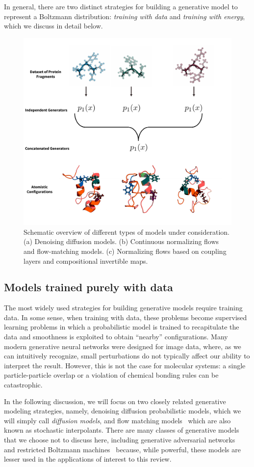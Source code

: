 \documentclass[11pt]{article}
\begin{document}
In general, there are two distinct strategies for building a generative model to represent a Boltzmann distribution: \emph{training with data} and \emph{training with energy}, which we discuss in detail below. 

\begin{figure}
\begin{center}
\includegraphics[width=0.5\linewidth]{modular_fig.pdf}
\end{center}
\caption{Schematic overview of different types of models under consideration. (a) Denoising diffusion models. (b) Continuous normalizing flows and flow-matching models. (c) Normalizing flows based on coupling layers and compositional invertible maps.}
\label{fig:models}
\end{figure}

\subsection{Models trained purely with data}

The most widely used strategies for building generative models require training data.
In some sense, when training with data, these problems become supervised learning problems in which a probabilistic model is trained to recapitulate the data and smoothness is exploited to obtain ``nearby'' configurations.
Many modern generative neural networks were designed for image data, where, as we can intuitively recognize, small perturbations do not typically affect our ability to interpret the result. 
However, this is not the case for molecular systems: a single particle-particle overlap or a violation of chemical bonding rules can be catastrophic. 

In the following discussion, we will focus on two closely related generative modeling strategies, namely, denoising diffusion probabilistic models, which we will simply call \emph{diffusion models}, and flow matching models~\cite{lipman_flow_2022, albergo_building_2022, albergo_stochastic_2023} which are also known as stochastic interpolants.  
There are many classes of generative models that we choose not to discuss here, including generative adversarial networks~\cite{goodfellow_generative_2014} and restricted Boltzmann machines~\cite{salakhutdinov_restricted_2007, salakhutdinov_deep_2009} because, while powerful, these models are lesser used in the applications of interest to this review. 
\end{document}
